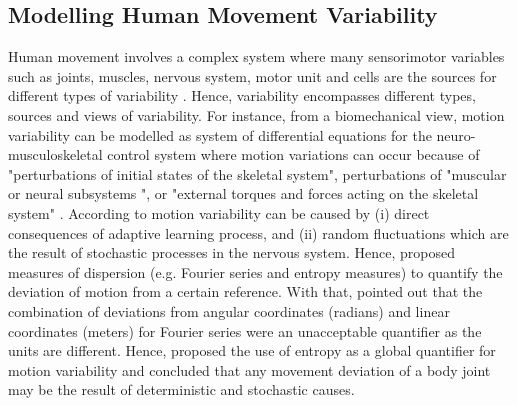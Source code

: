 \subsection{Modelling Human Movement Variability}
Human movement involves a complex system where many sensorimotor 
variables such as joints, muscles, nervous system, motor unit and cells 
are the sources for different types of variability \citep{newell1993}.
Hence, variability encompasses different types, sources and views of 
variability.
For instance, from a biomechanical view, motion variability can be modelled
as system of differential equations for the neuro-musculoskeletal 
control system where motion variations can occur because of 
"perturbations of initial states of the skeletal system",
perturbations of "muscular or neural subsystems ",
or "external torques and forces acting on the skeletal system" 
\citep[p. 13]{hatze1986}.
According to \cite{hatze1986} motion variability can be caused by 
(i) direct consequences of adaptive learning process, and 
(ii) random fluctuations which are the result of stochastic processes 
in the nervous system. Hence, \cite{hatze1986} proposed measures of 
dispersion (e.g. Fourier series and entropy measures) to quantify the 
deviation of motion from a certain reference. With that, 
\cite{hatze1986} pointed out that the combination of deviations from 
angular coordinates (radians) and linear coordinates (meters)
for Fourier series were an unacceptable quantifier as the units are different.
Hence, \cite{hatze1986} proposed the use of entropy as a global quantifier 
for motion variability and concluded that any movement deviation of a 
body joint may be the result of deterministic and stochastic causes.





